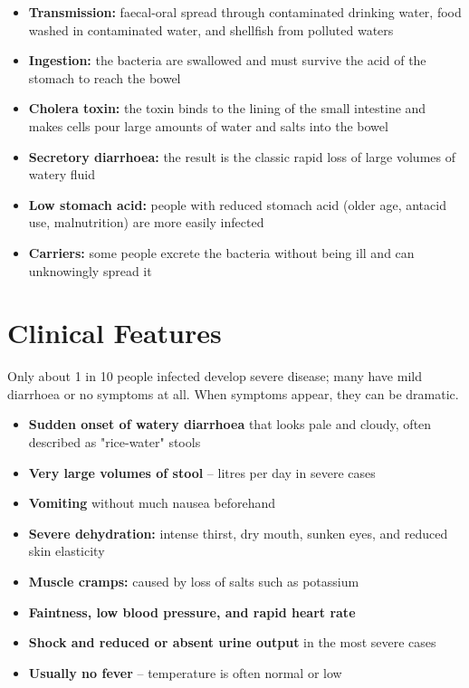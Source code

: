 \begin{itemize}
    \item \textbf{Transmission:} faecal-oral spread through contaminated drinking water, food washed in contaminated water, and shellfish from polluted waters
    \item \textbf{Ingestion:} the bacteria are swallowed and must survive the acid of the stomach to reach the bowel
    \item \textbf{Cholera toxin:} the toxin binds to the lining of the small intestine and makes cells pour large amounts of water and salts into the bowel
    \item \textbf{Secretory diarrhoea:} the result is the classic rapid loss of large volumes of watery fluid
    \item \textbf{Low stomach acid:} people with reduced stomach acid (older age, antacid use, malnutrition) are more easily infected
    \item \textbf{Carriers:} some people excrete the bacteria without being ill and can unknowingly spread it
\end{itemize}

\section*{Clinical Features}
Only about 1 in 10 people infected develop severe disease; many have mild diarrhoea or no symptoms at all. When symptoms appear, they can be dramatic.

\begin{itemize}
    \item \textbf{Sudden onset of watery diarrhoea} that looks pale and cloudy, often described as "rice-water" stools
    \item \textbf{Very large volumes of stool} -- litres per day in severe cases
    \item \textbf{Vomiting} without much nausea beforehand
    \item \textbf{Severe dehydration:} intense thirst, dry mouth, sunken eyes, and reduced skin elasticity
    \item \textbf{Muscle cramps:} caused by loss of salts such as potassium
    \item \textbf{Faintness, low blood pressure, and rapid heart rate}
    \item \textbf{Shock and reduced or absent urine output} in the most severe cases
    \item \textbf{Usually no fever} -- temperature is often normal or low
\end{itemize}

